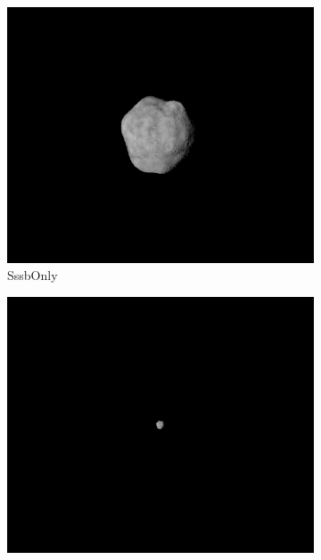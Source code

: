 \begin{figure}[htb]
    \centering
    \begin{subfigure}[b]{0.47\textwidth}
        \centering
        \includegraphics[width=\textwidth]{doc/thesis/0_figures/composition/SssbOnly_2017-08-15T115855-684000.png}
        \caption{SssbOnly}
        \label{fig:comp_sssbonly}
    \end{subfigure}
    \begin{subfigure}[b]{0.47\textwidth}
        \centering
        \includegraphics[width=\textwidth]{doc/thesis/0_figures/composition/SssbConstDist_2017-08-15T115855-684000.png}

\end{subfigure}
\end{figure}

